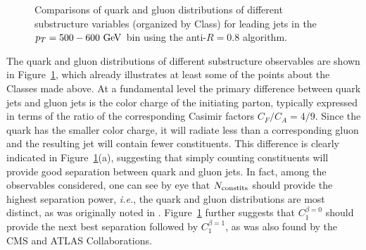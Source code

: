 \begin{figure}
\caption{Comparisons of quark and gluon distributions of different substructure variables (organized by Class) for leading jets in the 
$\pt=500-600 \GeV$ bin using the anti-\kT $R=0.8$ algorithm. }
\label{fig:qg_pt500_subst_AKt_R08}
\end{figure}

The quark and gluon distributions of different substructure observables
are shown in Figure~\ref{fig:qg_pt500_subst_AKt_R08}, which already illustrates at least some of the points about the Classes made above. 
At a fundamental level the primary difference between quark jets and gluon jets is the color charge of the initiating parton, typically expressed in terms of the
ratio of the corresponding Casimir factors $C_F/C_A = 4/9$.  Since the quark has the smaller color charge, it will radiate less than a corresponding
gluon and the resulting jet will contain fewer constituents. This difference is clearly indicated in Figure~\ref{fig:qg_pt500_subst_AKt_R08}(a), 
suggesting that simply counting constituents will provide good separation between quark and gluon jets.  In fact, among the observables
considered, one can see by eye that $N_{\rm constits}$ should provide the highest separation
power, \textit{i.e.}, the quark and gluon distributions are most distinct, as was originally noted in \cite{Gallicchio:2011xq,Gallicchio:2012ez}. 
Figure~\ref{fig:qg_pt500_subst_AKt_R08} further suggests
that $C_1^{\beta=0}$ should provide the next best separation followed by $C_1^{\beta=1}$, as was also
found by the CMS and ATLAS Collaborations\cite{Aad:2014gea}.   

